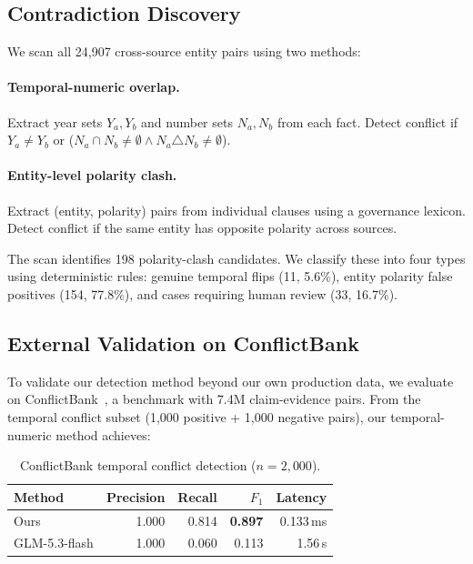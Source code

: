 \documentclass[sigconf]{acmart}
\begin{document}
\subsection{Contradiction Discovery}

We scan all 24{,}907 cross-source entity pairs using two methods:

\paragraph{Temporal-numeric overlap.} Extract year sets $Y_a, Y_b$ and number sets $N_a, N_b$ from each fact. Detect conflict if $Y_a \neq Y_b$ or ($N_a \cap N_b \neq \emptyset \wedge N_a \triangle N_b \neq \emptyset$).

\paragraph{Entity-level polarity clash.} Extract (entity, polarity) pairs from individual clauses using a governance lexicon. Detect conflict if the same entity has opposite polarity across sources.

The scan identifies 198 polarity-clash candidates. We classify these into four types using deterministic rules: genuine temporal flips (11, 5.6\%), entity polarity false positives (154, 77.8\%), and cases requiring human review (33, 16.7\%).

\subsection{External Validation on ConflictBank}

To validate our detection method beyond our own production data, we evaluate on ConflictBank~\cite{conflictbank}, a benchmark with 7.4M claim-evidence pairs. From the temporal conflict subset (1{,}000 positive + 1{,}000 negative pairs), our temporal-numeric method achieves:

\begin{table}[h]
\centering
\small
\caption{ConflictBank temporal conflict detection ($n{=}2{,}000$).}
\begin{tabular}{lrrrr}
\toprule
Method & Precision & Recall & $F_1$ & Latency \\
\midrule
Ours & 1.000 & 0.814 & \textbf{0.897} & 0.133\,ms \\
GLM-5.3-flash & 1.000 & 0.060 & 0.113 & 1.56\,s \\
\bottomrule
\end{tabular}
\label{tab:conflictbank}
\end{table}
\end{document}
